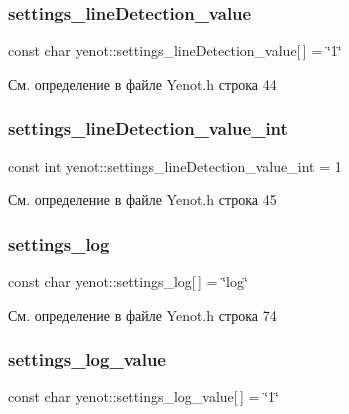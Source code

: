 \subsubsection{\texorpdfstring{settings\+\_\+line\+Detection\+\_\+value}{settings\_lineDetection\_value}}
{\footnotesize\ttfamily const char yenot\+::settings\+\_\+line\+Detection\+\_\+value\mbox{[}$\,$\mbox{]} = \char`\"{}1\char`\"{}}



См. определение в файле Yenot.\+h строка 44

\mbox{\label{namespaceyenot_ae8c5d5792720627ea225afb6ee387915}} 
\subsubsection{\texorpdfstring{settings\+\_\+line\+Detection\+\_\+value\+\_\+int}{settings\_lineDetection\_value\_int}}
{\footnotesize\ttfamily const int yenot\+::settings\+\_\+line\+Detection\+\_\+value\+\_\+int = 1}



См. определение в файле Yenot.\+h строка 45

\mbox{\label{namespaceyenot_ad8a7ef4466cc151f6f380b4c4ccbfa66}} 
\subsubsection{\texorpdfstring{settings\+\_\+log}{settings\_log}}
{\footnotesize\ttfamily const char yenot\+::settings\+\_\+log\mbox{[}$\,$\mbox{]} = \char`\"{}log\char`\"{}}



См. определение в файле Yenot.\+h строка 74

\mbox{\label{namespaceyenot_a8e18cd22c222abdaffa0e12b65af2ac5}} 
\subsubsection{\texorpdfstring{settings\+\_\+log\+\_\+value}{settings\_log\_value}}
{\footnotesize\ttfamily const char yenot\+::settings\+\_\+log\+\_\+value\mbox{[}$\,$\mbox{]} = \char`\"{}1\char`\"{}}



